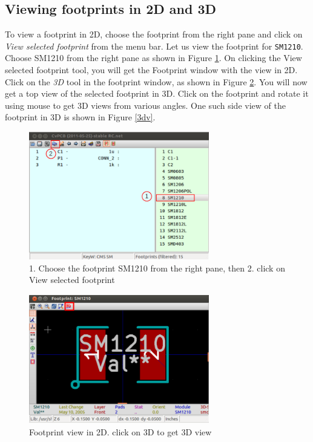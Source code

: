 \subsection{Viewing footprints in 2D and 3D}
\label{viewfp}
To view a footprint in 2D, choose the footprint from the right pane and click on \textit{View selected footprint} from the menu bar. Let us view the footprint for {\tt SM1210}. Choose SM1210 from the right pane as shown in Figure \ref{sm}. On clicking the View selected footprint tool, you will get the Footprint window with the view in 2D. Click on the \textit{3D} tool in the footprint window, as shown in Figure \ref{3d}. You will now get a top view of the selected footprint in 3D. Click on the footprint and rotate it using mouse to get 3D views from various angles. One such side view of the footprint in 3D is shown in Figure \ref{3dv}.
\begin{figure}
\centering
\includegraphics[width=0.7\textwidth]{figures/sm}
\caption{1. Choose the footprint SM1210 from the right pane, then 2. click on View selected footprint}
\label{sm}
\end{figure}
\begin{figure}
\centering
\includegraphics[width=0.7\textwidth]{figures/3d}
\caption{Footprint view in 2D. click on 3D to get 3D view}
\label{3d}
\end{figure}
